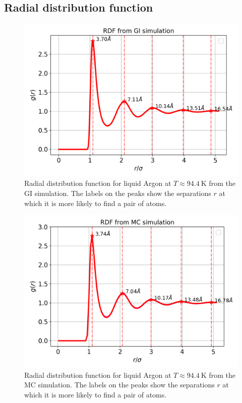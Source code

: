 \documentclass[%
aps,
pra,%
amsmath,amssymb,
preprint,%
reprint,%
notitlepage,
a4paper]{revtex4-1}
\begin{document}
\subsection{Radial distribution function}
\begin{figure}[t]
	\centering
	\includegraphics[width=0.9\linewidth]{../task2/results/gofr}
	\caption{Radial distribution function for liquid Argon at $T\approx\SI{94.4}{\kelvin}$ from the GI simulation. The labels on the peaks show the separations $r$ at which it is more likely to find a pair of atoms.}
	\label{fig:gofr}
\end{figure}
\begin{figure}[t]
	\centering
	\includegraphics[width=0.9\linewidth]{../task2/results/gofr_mc}
	\caption{Radial distribution function for liquid Argon at $T\approx\SI{94.4}{\kelvin}$ from the MC simulation. The labels on the peaks show the separations $r$ at which it is more likely to find a pair of atoms.}
	\label{fig:gofr_mc}
\end{figure}
\end{document}
